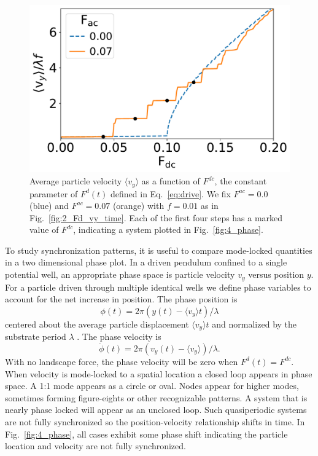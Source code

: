 \documentclass[twocolumn,showpacs,preprintnumbers,amsmath,amssymb,aps,prb]{revtex4}
\begin{document}
\begin{figure} %
\centering
\includegraphics[width=\columnwidth]{fig3_sweep_vyFDC.pdf}
\caption{Average particle velocity  $\langle v_{y} \rangle$
  as a function of $F^{dc}$, 
  the constant parameter of $F^d(t)$ defined in Eq.~\ref{eq:drive}.
  We fix
  $F^{ac}=0.0$ (blue) and 
  $F^{ac}=0.07$ (orange) with $f = 0.01$ 
  as in Fig.~\ref{fig:2_Fd_vy_time}.
  Each of the first four steps
  has a marked value of $F^{dc}$,
  indicating a system
  plotted in Fig.~\ref{fig:4_phase}.
}
\label{fig:3_sweep_vyFDC}
\end{figure}

  To study synchronization patterns, 
  it is useful to compare
  mode-locked quantities 
  in a two dimensional phase plot. 
  In a driven pendulum confined to a single potential well,
  an appropriate
  phase space is particle velocity $v_y$ versus position $y$.  
  For a particle driven 
  through multiple identical wells 
  we define phase variables 
  to account for the net increase in position.
  The phase position is
  \begin{equation}
    \phi(t) = 2\pi (y(t)-\langle v_y \rangle t)/\lambda
  \end{equation}
  centered about the average particle displacement $\langle v_y \rangle t$
  and normalized by the substrate period $\lambda$ \cite{Juniper2015}.
  The phase velocity is
  \begin{equation}
    \dot{\phi}(t) =2\pi (v_y(t)-\langle v_y \rangle) /\lambda.  
  \end{equation}
  With no landscape force, 
  the phase velocity will be zero when $F^d(t) = F^{dc}$.
  When velocity
  is mode-locked to 
  a spatial location
  a closed loop appears in  
  phase space. 
  A 1:1 mode appears as a circle or oval. 
  Nodes appear 
  for higher modes,
  sometimes forming figure-eights
  or other recognizable patterns.
  A system that is nearly phase locked
  will appear as an unclosed loop.
  Such quasiperiodic systems are
  not fully synchronized
  so the position-velocity relationship
  shifts in time.
  In Fig.~\ref{fig:4_phase}, 
  all cases exhibit some phase shift 
  indicating the particle location and velocity
  are not fully synchronized.
  
\end{document}
